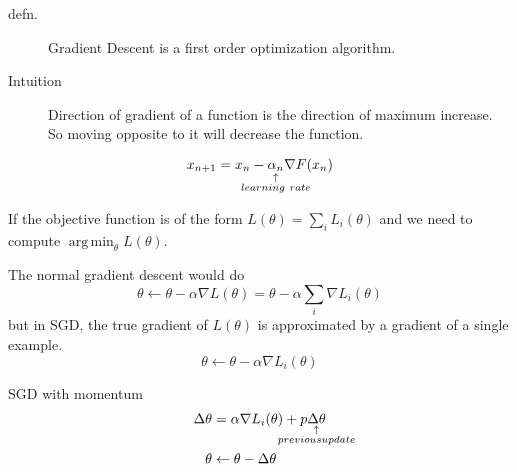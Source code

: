 \begin{slide}
  \begin{description}
    \item[defn.]Gradient Descent is a first order optimization algorithm. 
    \item[Intuition] Direction of gradient of a function is the direction of maximum increase. So moving opposite to it will decrease the function.
  \end{description}
  $$x_{n+1} = x_n - \explain{\alpha_n}{learning~rate} \nabla F(x_n)$$

\end{slide}
\begin{slide}
  If the objective function is of the form $L(\theta) = \sum_iL_i(\theta)$ and we need to compute $\mathop{\mathrm{arg\,min}}_\theta L(\theta)$.
  
  
  The normal gradient descent would do
  $$\theta \gets \theta - \alpha \nabla L(\theta) = \theta-\alpha\sum_i\nabla L_i(\theta)$$
  but in SGD, the true gradient of $L(\theta)$ is approximated by a gradient of a single example.
  $$\theta \gets \theta - \alpha\nabla L_i(\theta)$$

  SGD with momentum
  \begin{align*}
   \grad \theta &= \alpha \nabla L_i(\theta) + p \explain{\grad \theta}{previous update}
   \\
   \theta&\gets \theta -\grad \theta
  \end{align*}
\end{slide}
